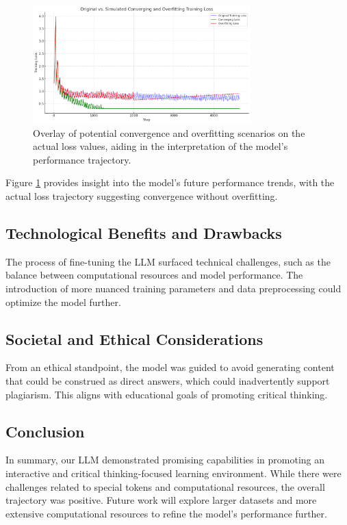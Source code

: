 \documentclass[]{article}
\begin{document}
\begin{figure}[h!]
\centering
\includegraphics[width=0.75\textwidth]{simulated_convergence.png}
\caption{Overlay of potential convergence and overfitting scenarios on the actual loss values, aiding in the interpretation of the model's performance trajectory.}
\label{fig:simulated_convergence}
\end{figure}

Figure \ref{fig:simulated_convergence} provides insight into the model's future performance trends, with the actual loss trajectory suggesting convergence without overfitting.

\subsection{Technological Benefits and Drawbacks}
The process of fine-tuning the LLM surfaced technical challenges, such as the balance between computational resources and model performance. The introduction of more nuanced training parameters and data preprocessing could optimize the model further.

\subsection{Societal and Ethical Considerations}
From an ethical standpoint, the model was guided to avoid generating content that could be construed as direct answers, which could inadvertently support plagiarism. This aligns with educational goals of promoting critical thinking.

\subsection{Conclusion}
In summary, our LLM demonstrated promising capabilities in promoting an interactive and critical thinking-focused learning environment. While there were challenges related to special tokens and computational resources, the overall trajectory was positive. Future work will explore larger datasets and more extensive computational resources to refine the model's performance further.
\end{document}
